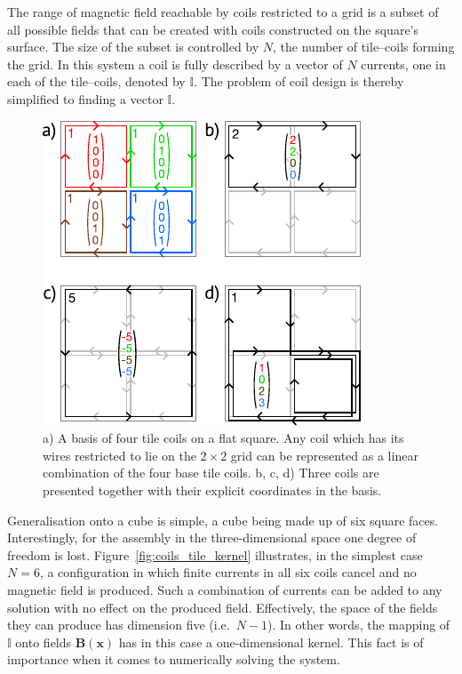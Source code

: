 The range of magnetic field reachable by coils restricted to a grid is a subset of all possible fields that can be created with coils constructed on the square's surface. The size of the subset is controlled by $N$, the number of tile--coils forming the grid.
In this system a coil is fully described by a vector of $N$ currents, one in each of the tile--coils, denoted by $\mathbb{I}$. The problem of coil design is thereby simplified to finding a vector $\mathbb{I}$.


\begin{figure}
  \centering
  \includegraphics[width=0.6\linewidth]{gfx/coils/tile_basis.pdf}
  \caption{a) A basis of four tile coils on a flat square. Any coil which has its wires restricted to lie on the $2 \times 2$ grid can be represented as a linear combination of the four base tile coils. b, c, d) Three coils are presented together with their explicit coordinates in the basis.}
  \label{fig:coils_tile_basis}
\end{figure}

Generalisation onto a cube is simple, a cube being made up of six square faces. Interestingly, for the assembly in the three-dimensional space one degree of freedom is lost.  Figure~\ref{fig:coils_tile_kernel} illustrates, in the simplest case $N = 6$, a configuration in which finite currents in all six coils cancel and no magnetic field is produced. Such a combination of currents can be added to any solution with no effect on the produced field. Effectively, the space of the fields they can produce has dimension five (i.e.\ $N-1$). In other words, the mapping of $\mathbb{I}$ onto fields $\mathbf{B}(\mathbf{x})$ has in this case a one-dimensional kernel. This fact is of importance when it comes to numerically solving the system.


